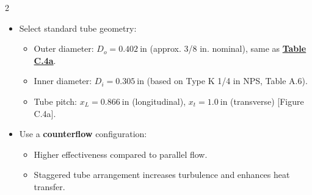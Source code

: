 \begin{multicols*}{2}
\begin{enumerate}
\begin{itemize}
\begin{itemize}
                        \end{itemize}
                  \item Select standard tube geometry:
                        \begin{itemize}
                            \item Outer diameter: $D_o = 0.402~\text{in}$ (approx. 3/8 in. nominal), same as \underline{\textbf{Table C.4a}}.
                            \item Inner diameter: $D_i = 0.305~\text{in}$ (based on Type K 1/4 in NPS, Table A.6).
                            \item Tube pitch: $x_L = 0.866~\text{in}$ (longitudinal), $x_t = 1.0~\text{in}$ (transverse) [Figure C.4a].
                        \end{itemize}
                  \item Use a \textbf{counterflow} configuration:
                        \begin{itemize}
                            \item Higher effectiveness compared to parallel flow.
                            \item Staggered tube arrangement increases turbulence and enhances heat transfer.
                        \end{itemize}
              \end{itemize}


\end{enumerate}
\end{multicols*}
